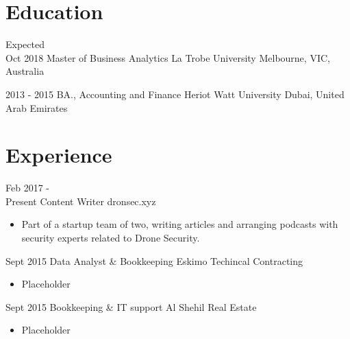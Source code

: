 \documentclass[letterpaper]{twentysecondcv} %
\begin{document}
\makeprofile %

\section{Education}

\begin{twenty} %
	\twentyitem
    	{Expected \\ Oct 2018}
        {Master of Business Analytics}
        {La Trobe University}
        {Melbourne, VIC, Australia}
        
	\twentyitem
    	{2013 - 2015}
        {BA., Accounting and Finance}
        {Heriot Watt University}
        {Dubai, United Arab Emirates}
        
\end{twenty}



\section{Experience}

\begin{twenty} %
	\twentyitem
    	{Feb 2017 - \\Present}
        {Content Writer}
        {dronsec.xyz}
        {}
        {
        {\begin{itemize}
        \item Part of a startup team of two, writing articles and arranging podcasts with security experts related to Drone Security.
    \end{itemize}}
        }
        
    \twentyitem
   		{Sept 2015}
        {Data Analyst \& Bookkeeping}
        {Eskimo Techincal Contracting}
        {}
        {
        {\begin{itemize}
        \item Placeholder
    \end{itemize}}
        }
        
    \twentyitem
   		{Sept 2015}
        {Bookkeeping \& IT support}
        {Al Shehil Real Estate}
        {}
        {
        {\begin{itemize}
        \item Placeholder
    \end{itemize}}
        }
        
\end{twenty}
\end{document}

